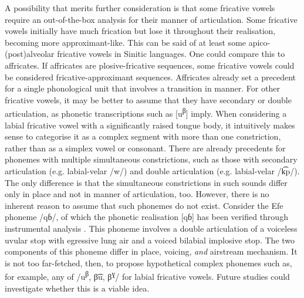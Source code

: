 \documentclass[output=paper,colorlinks,citecolor=brown,chinesefont]{langscibook}
\begin{document}
A possibility that merits further consideration is that some fricative vowels require an out-of-the-box analysis for their manner of articulation. Some fricative vowels initially have much frication but lose it throughout their realisation, becoming more approximant-like. This can be said of at least some apico-(post)alveolar fricative vowels in Sinitic languages. One could compare this to affricates. If affricates are plosive-fricative sequences, some fricative vowels could be considered fricative-approximant sequences. Affricates already set a precedent for a single phonological unit that involves a transition in manner. For other fricative vowels, it may be better to assume that they have secondary or double articulation, as phonetic transcriptions such as [u\textsuperscript{β}] imply. When considering a labial fricative vowel with a significantly raised tongue body, it intuitively makes sense to categorise it as a complex segment with more than one constriction, rather than as a simplex vowel or consonant. There are already precedents for phonemes with multiple simultaneous constrictions, such as those with secondary articulation (e.g. labial-velar /w/) and double articulation (e.g. labial-velar /k͡p/). The only difference is that the simultaneous constrictions in such sounds differ only in place and not in manner of articulation, too. However, there is no inherent reason to assume that such phonemes do not exist. Consider the Efe phoneme /qɓ/, of which the phonetic realisation [qɓ] has been verified through instrumental analysis \citep{Demolin&Soquet_1999}. This phoneme involves a double articulation of a voiceless uvular stop with egressive lung air and a voiced bilabial implosive stop. The two components of this phoneme differ in place, voicing, \textit{and} airstream mechanism. It is not too far-fetched, then, to propose hypothetical complex phonemes such as, for example, any of /u\textsuperscript{β}, β͡u, β\textsuperscript{ɣ}/ for labial fricative vowels. Future studies could investigate whether this is a viable idea.
\end{document}
